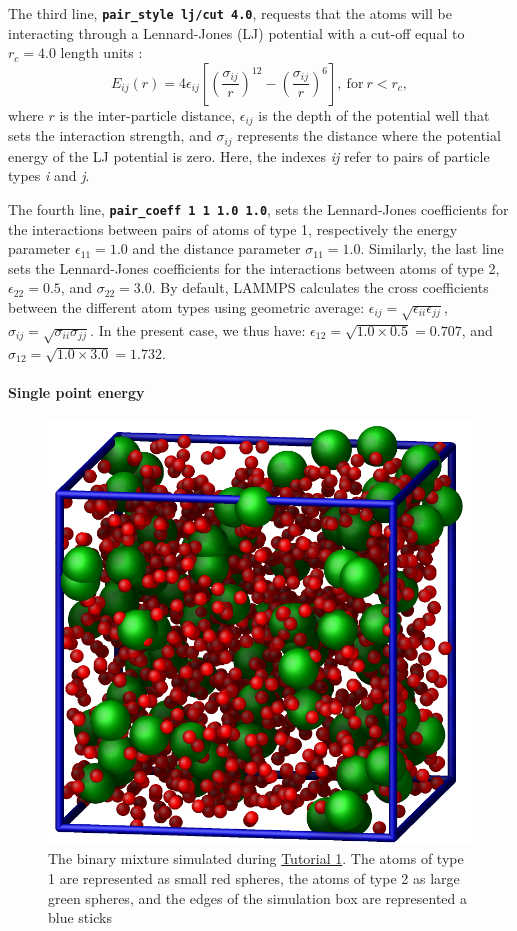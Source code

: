\documentclass[9pt,tutorial]{livecoms}
\newcommand{\lmpcmd}[1]{\texttt{\normalsize\bfseries\textcolor{command}{#1}}}
\begin{document}
The third line, \lmpcmd{pair\_style lj/cut 4.0}, requests that the atoms
will be interacting through a Lennard-Jones (LJ) potential with a
cut-off equal to $r_c = 4.0$ length units
\cite{wang2020lennard,fischer2023history}:
$$E_{ij} (r) = 4 \epsilon_{ij} \left[ \left( \dfrac{\sigma_{ij}}{r} \right)^{12}
  - \left( \dfrac{\sigma_{ij}}{r} \right)^{6} \right], ~ \text{for} ~ r
< r_c,$$ where $r$ is the inter-particle distance, $\epsilon_{ij}$ is
the depth of the potential well that sets the interaction strength, and
$\sigma_{ij}$ represents the distance where the potential energy of the
LJ potential is zero.  Here, the indexes \textit{ij} refer to pairs of
particle types \textit{i} and \textit{j}.

The fourth line, \lmpcmd{pair\_coeff 1 1 1.0 1.0}, sets the
Lennard-Jones coefficients for the interactions between pairs of atoms
of type 1, respectively the energy parameter $\epsilon_{11} = 1.0$ and
the distance parameter $\sigma_{11} = 1.0$.  Similarly, the last line
sets the Lennard-Jones coefficients for the interactions between atoms
of type 2, $\epsilon_{22} = 0.5$, and $\sigma_{22} = 3.0$.  By default,
LAMMPS calculates the cross coefficients between the different atom
types using geometric average:
$\epsilon_{ij} = \sqrt{\epsilon_{ii} \epsilon_{jj}}$,
$\sigma_{ij} = \sqrt{\sigma_{ii} \sigma_{jj}}$.  In the present case, we
thus have: $\epsilon_{12} = \sqrt{1.0 \times 0.5} = 0.707$, and
$\sigma_{12} = \sqrt{1.0 \times 3.0} = 1.732$.

\paragraph{Single point energy}
\begin{figure}
\centering
\includegraphics[width=0.55\linewidth]{LJ}
\caption{The binary mixture simulated during \hyperref[lennard-jones-label]{Tutorial 1}.
  The atoms of type 1 are represented as small red spheres, the atoms of type 2 as large
  green spheres, and the edges of the simulation box are represented a blue sticks}
\label{fig:LJ}
\end{figure}
\end{document}
